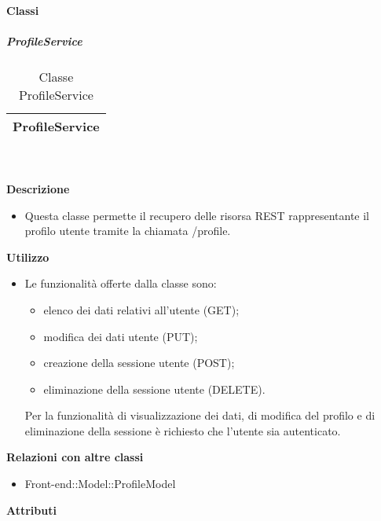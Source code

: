 		\paragraph{Classi}
			\subparagraph{ProfileService} 
\begin{table}[ht]
\begin{center}
\bgroup
	\setlength{\arrayrulewidth}{0.6mm}
	\def\arraystretch{1}
		\begin{tabular}{ | p{12cm} | }
				\hline  
					\centerline{\textbf{ProfileService}}
		\\ \hline 
				\hline
				\hline
		
		\end{tabular}
\egroup
\caption{Classe ProfileService}
\end{center}
\end{table}  \textbf{\\ \\ Descrizione} 
					\begin{itemize}
						\item[] Questa classe permette il recupero delle risorsa REST rappresentante il profilo utente tramite la chiamata /profile.
					\end{itemize}      
				\textbf{Utilizzo}  
					\begin{itemize}
						\item[] Le funzionalità offerte dalla classe sono:
\begin{itemize}
\item elenco dei dati relativi all'utente (GET);
\item modifica dei dati utente (PUT);
\item creazione della sessione utente (POST);
\item eliminazione della sessione utente (DELETE).
\end{itemize}

Per la funzionalità di visualizzazione dei dati, di modifica del profilo e di eliminazione della sessione è richiesto che l'utente sia autenticato.
					\end{itemize}
					\textbf{Relazioni con altre classi}
					\begin{itemize}
							\item{Front-end::Model::ProfileModel}
					\end{itemize}
			 \textbf{Attributi} 
	\begin{itemize}
		\end{itemize}
		
